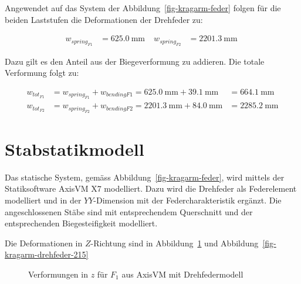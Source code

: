 \documentclass[
  11pt,
  letterpaper,
]{scrreprt}
\begin{document}
Angewendet auf das System der Abbildung~\ref{fig-kragarm-feder} folgen
für die beiden Laststufen die Deformationen der Drehfeder zu:

$$
\begin{aligned}
w_{spring_{F1}} &= 625.0\ \mathrm{mm} \; 
 &w_{spring_{F2}} &= 2201.3\ \mathrm{mm} \;
\end{aligned}
$$

Dazu gilt es den Anteil aus der Biegeverformung zu addieren. Die totale
Verformung folgt zu:

$$
\begin{aligned}
w_{tot_{F1}} &= w_{spring_{F1}} + w_{bendingF1}  = 625.0\ \mathrm{mm} + 39.1\ \mathrm{mm} &= 664.1\ \mathrm{mm}  
\\[12pt]
w_{tot_{F2}} &= w_{spring_{F2}} + w_{bendingF2}  = 2201.3\ \mathrm{mm} + 84.0\ \mathrm{mm} &= 2285.2\ \mathrm{mm}  
\end{aligned}
$$

\section{Stabstatikmodell}\label{stabstatikmodell}

Das statische System, gemäss Abbildung~\ref{fig-kragarm-feder}, wird
mittels der Statiksoftware AxisVM X7 modelliert. Dazu wird die Drehfeder
als Federelement modelliert und in der \(YY\)-Dimension mit der
Federcharakteristik ergänzt. Die angeschlossenen Stäbe sind mit
entsprechendem Querschnitt und der entsprechenden Biegesteifigkeit
modelliert.

Die Deformationen in \(Z\)-Richtung sind in
Abbildung~\ref{fig-kragarm-drehfeder-10} und
Abbildung~\ref{fig-kragarm-drehfeder-215}

\begin{figure}[H]


\caption{\label{fig-kragarm-drehfeder-10}Verformungen in \(z\) für
\(F_1\) aus AxisVM mit Drehfedermodell}

\end{figure}%
\end{document}
